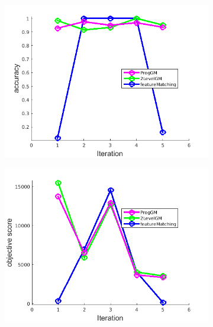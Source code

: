 \documentclass[
	fontsize=12pt,
	paper=a4,
	twoside=false,
	numbers=noenddot,
	plainheadsepline,
	toc=listof,
	toc=bibliography
]{scrartcl}
\begin{document}
\begin{figure}[h] 
	\begin{subfigure}[b]{0.3\textwidth}
		\centering
		\includegraphics[scale=0.25]{"fig_ver2608/RealImages/Img_trafo/no_descr/using_ransac_afftrafo/accuracy"} 
	\end{subfigure}%
	\begin{subfigure}[b]{0.3\textwidth}
		\centering
		\includegraphics[scale=0.25]{"fig_ver2608/RealImages/Img_trafo/no_descr/using_ransac_afftrafo/score"}   
	\end{subfigure} 
	\begin{subfigure}[b]{0.3\textwidth}
		\centering

\end{subfigure}
\end{figure}
\end{document}
